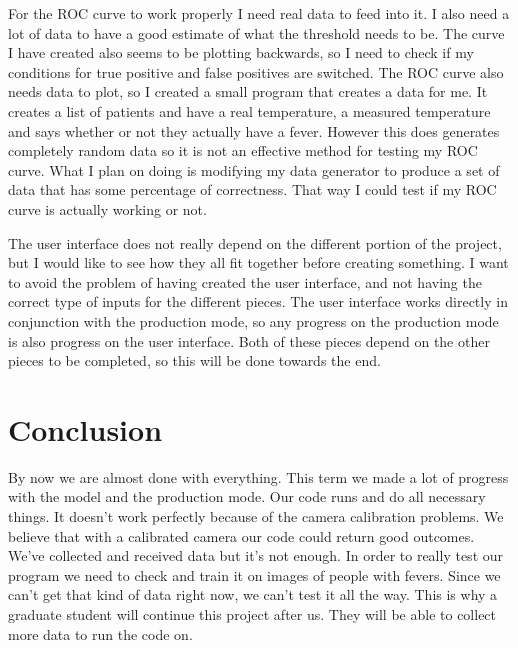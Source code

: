\documentclass[onecolumn, draftclsnofoot,10pt, compsoc]{IEEEtran}
\begin{document}
For the ROC curve to work properly I need real data to feed into it. I also need a lot of data to have a good estimate of what the threshold needs to be. The curve I have created also seems to be plotting backwards, so I need to check if my conditions for true positive and false positives are switched. The ROC curve also needs data to plot, so I created a small program that creates a data for me. It creates a list of patients and have a real temperature, a measured temperature and says whether or not they actually have a fever. However this does generates completely random data so it is not an effective method for testing my ROC curve. What I plan on doing is modifying my data generator to produce a set of data that has some percentage of correctness. That way I could test if my ROC curve is actually working or not.

The user interface does not really depend on the different portion of the project, but I would like to see how they all fit together before creating something. I want to avoid the problem of having created the user interface, and not having the correct type of inputs for the different pieces. The user interface works directly in conjunction with the production mode, so any progress on the production mode is also progress on the user interface. Both of these pieces depend on the other pieces to be completed, so this will be done towards the end.


\section{Conclusion}


By now we are almost done with everything. This term we made a lot of progress with the model and the production mode. Our code runs and do all necessary things. It doesn’t work perfectly because of the camera calibration problems. We believe that with a calibrated camera our code could return good outcomes. We’ve collected and received data but it’s not enough. In order to really test our program we need to check and train it on images of people with fevers. Since we can’t get that kind of data right now, we can’t test it all the way. This is why a graduate student will continue this project after us. They will be able to collect more data to run the code on. 








\end{document}
